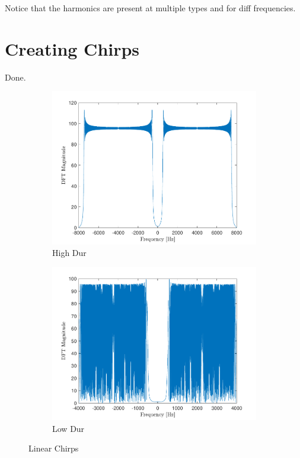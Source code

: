\documentclass[10pt]{article}
\begin{document}
Notice that the harmonics are present at multiple types and for diff frequencies.

\section{Creating Chirps}
Done.

\begin{figure}[ht]
    \centering
    \begin{subfigure}[b]{0.48\textwidth}
        \includegraphics[width=\textwidth]{problem8_fft_linear_chirp.pdf}
        \caption{High Dur}
    \end{subfigure}
    \quad
    \begin{subfigure}[b]{0.48\textwidth}
        \includegraphics[width=\textwidth]{problem8_fft_subsampled_linear_chirp.pdf}
        \caption{Low Dur}
    \end{subfigure}
    \caption{Linear Chirps\vspace{-0.5cm}}
    \label{linear_chirp_fft}
\end{figure}
\end{document}

